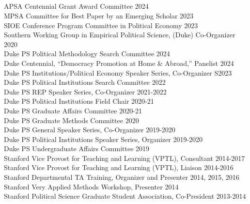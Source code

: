 \documentclass[11pt]{article}
\begin{document}

\vspace{.3in}
\begin{minipage}[t]{.21\textwidth}
	 \\
	 \\
	\hspace*{.18in}  \\
	\hspace*{.48in}  \\
\end{minipage}
\begin{minipage}[t]{.79\textwidth}
		APSA Centennial Grant Award Committee \hfill 2024 \\
		MPSA Committee for Best Paper by an Emerging Scholar \hfill 2023 \\
		SIOE Conference Program Committee in Political Economy \hfill 2023 \\
		Southern Working Group in Empirical Political Science, (Duke) Co-Organizer \hfill 2020 \\

		\vspace{-.1in}
	 Duke PS Political Methodology Search Committee \hfill 2024 \\
	 Duke Centennial, ``Democracy Promotion at Home \& Abroad,'' Panelist \hfill 2024 \\
	 Duke PS Institutions/Political Economy Speaker Series, Co-Organizer \hfill S2023 \\
	 Duke PS Political Institutions Search Committee \hfill 2022 \\
	 Duke PS REP Speaker Series, Co-Organizer \hfill 2021-2022 \\
	 Duke PS Political Institutions Field Chair \hfill 2020-21 \\
	 Duke PS Graduate Affairs Committee \hfill 2020-21 \\
	 Duke PS Graduate Methods Committee \hfill 2020 \\
   Duke PS General Speaker Series, Co-Organizer \hfill 2019-2020 \\
	 Duke PS Political Institutions Speaker Series, Organizer \hfill 2019-2020 \\
	 Duke PS Undergraduate Affairs Committee \hfill 2019 \\

	\vspace{-.1in}
	Stanford Vice Provost for Teaching and Learning (VPTL), Consultant 			\hfill 2014-2017 \\
	Stanford Vice Provost for Teaching and Learning (VPTL), Liaison 				\hfill 2014-2016 \\
	Stanford Departmental TA Training, Organizer and Presenter		 				\hfill 2014, 2015, 2016 \\
	Stanford Very Applied Methods Workshop, Presenter 							\hfill 2014 \\
	Stanford Political Science Graduate Student Association, Co-President 			\hfill 2013-2014\\
\end{minipage}
\end{document}
